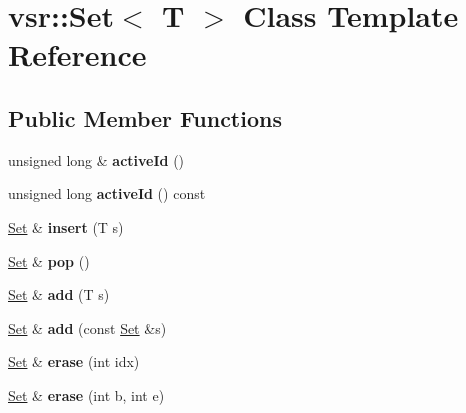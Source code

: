 \hypertarget{classvsr_1_1_set}{\section{vsr\-:\-:Set$<$ T $>$ Class Template Reference}
\label{classvsr_1_1_set}
}
\subsection*{Public Member Functions}
\begin{DoxyCompactItemize}
\item 
\hypertarget{classvsr_1_1_set_a8a99f00a407f7e5b8209bd434e567cd8}{unsigned long \& {\bfseries active\-Id} ()}\label{classvsr_1_1_set_a8a99f00a407f7e5b8209bd434e567cd8}

\item 
\hypertarget{classvsr_1_1_set_ad0f974ee51726fb79eeb4e8feb6454f8}{unsigned long {\bfseries active\-Id} () const }\label{classvsr_1_1_set_ad0f974ee51726fb79eeb4e8feb6454f8}

\item 
\hypertarget{classvsr_1_1_set_a668174e109f2674b5add8574a7ab9da5}{\hyperlink{classvsr_1_1_set}{Set} \& {\bfseries insert} (T s)}\label{classvsr_1_1_set_a668174e109f2674b5add8574a7ab9da5}

\item 
\hypertarget{classvsr_1_1_set_a9d312f37f266688389ebc5e33d8c32d9}{\hyperlink{classvsr_1_1_set}{Set} \& {\bfseries pop} ()}\label{classvsr_1_1_set_a9d312f37f266688389ebc5e33d8c32d9}

\item 
\hypertarget{classvsr_1_1_set_ad8e4e4d7c816965b405e7968bbf450db}{\hyperlink{classvsr_1_1_set}{Set} \& {\bfseries add} (T s)}\label{classvsr_1_1_set_ad8e4e4d7c816965b405e7968bbf450db}

\item 
\hypertarget{classvsr_1_1_set_a5dd3c5337f38a88cc6b397ddd5bf08d7}{\hyperlink{classvsr_1_1_set}{Set} \& {\bfseries add} (const \hyperlink{classvsr_1_1_set}{Set} \&s)}\label{classvsr_1_1_set_a5dd3c5337f38a88cc6b397ddd5bf08d7}

\item 
\hypertarget{classvsr_1_1_set_a786b8c3f97660bd2fc95431c5f0d0386}{\hyperlink{classvsr_1_1_set}{Set} \& {\bfseries erase} (int idx)}\label{classvsr_1_1_set_a786b8c3f97660bd2fc95431c5f0d0386}

\item 
\hypertarget{classvsr_1_1_set_a98bd3fc988379a863a2a7b744217079d}{\hyperlink{classvsr_1_1_set}{Set} \& {\bfseries erase} (int b, int e)}\label{classvsr_1_1_set_a98bd3fc988379a863a2a7b744217079d}


\end{DoxyCompactItemize}
